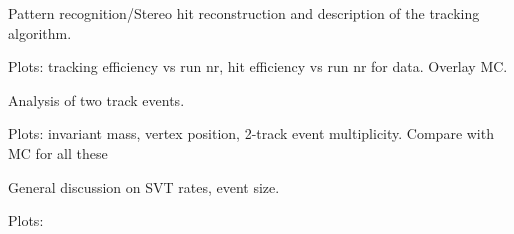 \vspace{1cm}{\bf Tracking algorithms [Matt/Omar]}


Pattern recognition/Stereo hit reconstruction and description of the tracking algorithm. 

Plots: tracking efficiency vs run nr, hit efficiency vs run nr for data. Overlay MC.

\vspace{1cm}{\bf Two track events analysis [Matt]}

Analysis of two track events. 

Plots: invariant mass, vertex position, 2-track event multiplicity. Compare with MC for all these 


\vspace{1cm}{\bf SVT DAQ Performance [Pelle/Omar/Ryan]}
General discussion on SVT rates, event size.

Plots: 
